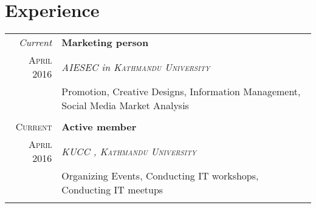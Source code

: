 \documentclass[a4paper,10pt]{article}
\begin{document}
\section{Experience}
\begin{tabular}{r|p{11cm}}
 \emph{Current} & \textbf{Marketing person}\\ \textsc{April 2016} & \emph{\textsc{AIESEC} in \textsc{Kathmandu University}} \\&\footnotesize{Promotion, Creative Designs, Information Management, Social Media Market Analysis}\\\multicolumn{2}{c}{} \\
 \textsc{Current} & \textbf{Active member} \\ \textsc{April 2016} &\emph{\textsc{KUCC} , \textsc{Kathmandu University}}\\&\footnotesize{Organizing Events, Conducting IT workshops, Conducting IT meetups}\\\multicolumn{2}{c}{} 
\end{tabular}
\end{document}
